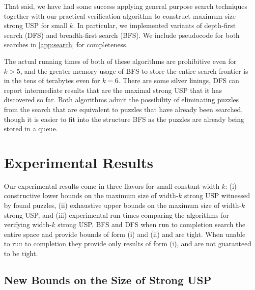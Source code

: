 \documentclass[11pt]{article}
\begin{document}
That said, we have had some success applying general purpose search
techniques together with our practical verification algorithm to
construct maximum-size strong USP for small $k$.  In particular, we
implemented variants of depth-first search (DFS) and breadth-first
search (BFS).  We include pseudocode for both searches in
\autoref{app:search} for completeness.

The actual running times of both of these algorithms are prohibitive
even for $k > 5$, and the greater memory usage of \textsc{BFS} to
store the entire search frontier is in the tens of terabytes
even for $k = 6$.  There are some silver linings, \textsc{DFS} can
report intermediate results that are the maximal strong USP that it
has discovered so far.  Both algorithms admit the possibility of
eliminating puzzles from the search that are equivalent to puzzles
that have already been searched, though it is easier to fit into the
structure \textsc{BFS} as the puzzles are already being stored in a
queue.

\begin{comment}
  Not planning to discuss:
  \begin{itemize}
  \item A$^*$ + admissible heuristics.
  \item Upper bounds from A$^*$.
  \item Symmetry removal.
  \end{itemize}
\end{comment}

\section{Experimental Results}
\label{sec:results}

Our experimental results come in three flavors for small-constant
width $k$: (i) constructive lower bounds on the maximum size of
width-$k$ strong USP witnessed by found puzzles, (ii) exhaustive upper
bounds on the maximum size of width-$k$ strong USP, and (iii)
experimental run times comparing the algorithms for verifying
width-$k$ strong USP.
\textsc{BFS} and \textsc{DFS} when run to completion search the entire
space and provide bounds of form (i) and (ii) and are
tight.  When unable to run to completion they provide only
results of form (i), and are not guaranteed to be tight.

\subsection{New Bounds on the Size of Strong USP}
\label{subsec:usps_found}
\end{document}
